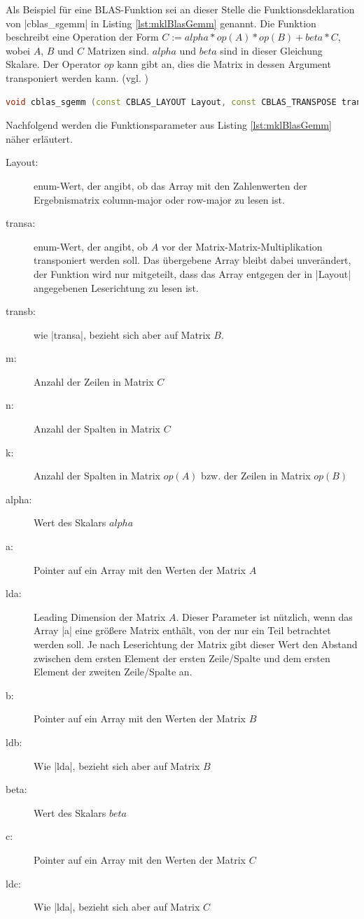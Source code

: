 \documentclass[../main.tex]{subfiles}
\begin{document}
Als Beispiel für eine BLAS-Funktion sei an dieser Stelle die Funktionsdeklaration von |cblas_sgemm| in Listing \ref{lst:mklBlasGemm} genannt. Die Funktion beschreibt eine Operation der Form \(C := alpha*op(A)*op(B) + beta*C\), wobei \(A\), \(B\) und \(C\) Matrizen sind. \(alpha\) und \(beta\) sind in dieser Gleichung Skalare. Der Operator \(op\) kann gibt an, dies die Matrix in dessen Argument transponiert werden kann. (vgl. \cite{MKLdevReference})
\begin{lstlisting}[language=c++, caption={Deklaration einer BLAS-Funktion zur Matrix-Matrix-Multiplikation(Quelle: \parencite{MKLdevReference})}, captionpos=b, label=lst:mklBlasGemm, frame=single, linewidth=\textwidth, breaklines=true]
void cblas_sgemm (const CBLAS_LAYOUT Layout, const CBLAS_TRANSPOSE transa, const CBLAS_TRANSPOSE transb, const MKL_INT m, const MKL_INT n, const MKL_INT k, const float alpha, const float *a, const MKL_INT lda, const float *b, const MKL_INT ldb, const float beta, float *c, const MKL_INT ldc);
\end{lstlisting}
Nachfolgend werden die Funktionsparameter aus Listing \ref{lst:mklBlasGemm} näher erläutert. 
\begin{description}
\item[Layout:] enum-Wert, der angibt, ob das Array mit den Zahlenwerten der Ergebnismatrix column-major oder row-major zu lesen ist. 
\item[transa:] enum-Wert, der angibt, ob \(A\) vor der Matrix-Matrix-Multiplikation transponiert werden soll. Das übergebene Array bleibt dabei unverändert, der Funktion wird nur mitgeteilt, dass das Array entgegen der in |Layout| angegebenen Leserichtung zu lesen ist. 
\item[transb:] wie |transa|, bezieht sich aber auf Matrix \(B\). 
\item[m:] Anzahl der Zeilen in Matrix \(C\)
\item[n:] Anzahl der Spalten in Matrix \(C\)
\item[k:] Anzahl der Spalten in Matrix \(op(A)\) bzw. der Zeilen in Matrix \(op(B)\)
\item[alpha:] Wert des Skalars \(alpha\)
\item[a:] Pointer auf ein Array mit den Werten der Matrix \(A\)
\item[lda:] Leading Dimension der Matrix \(A\). Dieser Parameter ist nützlich, wenn das Array |a| eine größere Matrix enthält, von der nur ein Teil betrachtet werden soll. Je nach Leserichtung der Matrix gibt dieser Wert den Abstand zwischen dem ersten Element der ersten Zeile/Spalte und dem ersten Element der zweiten Zeile/Spalte an. 
\item[b:] Pointer auf ein Array mit den Werten der Matrix \(B\)
\item[ldb:] Wie |lda|, bezieht sich aber auf Matrix \(B\)
\item[beta:] Wert des Skalars \(beta\)
\item[c:] Pointer auf ein Array mit den Werten der Matrix \(C\)
\item[ldc:] Wie |lda|, bezieht sich aber auf Matrix \(C\)
\end{description}
\end{document}

